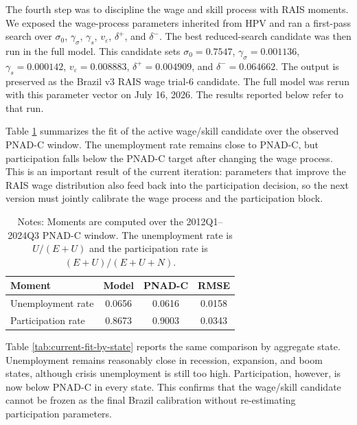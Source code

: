 \documentclass[12pt]{article}
\begin{document}
	The fourth step was to discipline the wage and skill process with RAIS moments. We exposed the wage-process parameters inherited from HPV and ran a first-pass search over $\sigma_0$, $\gamma_{\sigma}$, $\gamma_s$, $v_{\varepsilon}$, $\delta^+$, and $\delta^-$. The best reduced-search candidate was then run in the full model. This candidate sets $\sigma_0=0.7547$, $\gamma_{\sigma}=0.001136$, $\gamma_s=0.000142$, $v_{\varepsilon}=0.008883$, $\delta^+=0.004909$, and $\delta^-=0.064662$. The output is preserved as the Brazil v3 RAIS wage trial-6 candidate.
	The full model was rerun with this parameter vector on July 16, 2026. The results reported below refer to that run.

	Table \ref{tab:current-fit-summary} summarizes the fit of the active wage/skill candidate over the observed PNAD-C window. The unemployment rate remains close to PNAD-C, but participation falls below the PNAD-C target after changing the wage process. This is an important result of the current iteration: parameters that improve the RAIS wage distribution also feed back into the participation decision, so the next version must jointly calibrate the wage process and the participation block.

	\begin{table}[H]
		\centering
		\caption{Current Fit to PNAD-C Targets}
		\label{tab:current-fit-summary}
		\small
		\begin{tabular}{lccc}
			\toprule
			Moment & Model & PNAD-C & RMSE \\
			\midrule
			Unemployment rate & 0.0656 & 0.0616 & 0.0158 \\
			Participation rate & 0.8673 & 0.9003 & 0.0343 \\
			\bottomrule
		\end{tabular}
		\caption*{Notes: Moments are computed over the 2012Q1--2024Q3 PNAD-C window. The unemployment rate is $U/(E+U)$ and the participation rate is $(E+U)/(E+U+N)$.}
	\end{table}

	Table \ref{tab:current-fit-by-state} reports the same comparison by aggregate state. Unemployment remains reasonably close in recession, expansion, and boom states, although crisis unemployment is still too high. Participation, however, is now below PNAD-C in every state. This confirms that the wage/skill candidate cannot be frozen as the final Brazil calibration without re-estimating participation parameters.
\end{document}
